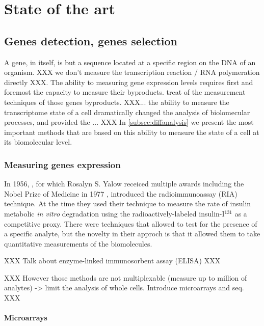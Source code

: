 \chapter{State of the art}
\label{chap:state}

\section{Genes detection, genes selection}

	A gene, in itself, is but a sequence located at a specific region on the DNA of an organism.
	XXX we don't measure the transcription reaction / RNA polymeration directly XXX.
	The ability to measuring gene expression levels requires first and foremost the capacity to measure their byproducts.
	 treat of the measurement techniques of those genes byproducts.
	XXX... the ability to measure the transcriptome state of a cell dramatically changed the analysis of biolomecular processes, and provided the ... XXX
	In \cref{subsec:diffanalysis} we present the most important methods that are based on this ability to measure the state of a cell at its biomolecular level.

	\subsection{Measuring genes expression}
	\label{subsec:measuregenes}

	In 1956, \textcite{berson1956insulin}, for which Rosalyn S. Yalow receiced multiple awards including the Nobel Prize of Medicine in 1977 \parencite{SJI:SJI21}, introduced the radioimmunoassay (RIA) technique.
	At the time they used their technique to measure the rate of insulin metabolic \emph{in vitro} degradation using the radioactively-labeled insulin-I$^{131}$ as a competitive proxy.
	There were techniques that allowed to test for the presence of a specific analyte, but the novelty in their approch is that it allowed them to take quantitative measurements of the biomolecules.

	XXX Talk about enzyme-linked immunosorbent assay (ELISA) XXX

	XXX However those methods are not multiplexable (measure up to million of analytes) -> limit the analysis of whole cells.
	Introduce microarrays and seq. XXX

	\subsubsection{Microarrays}

